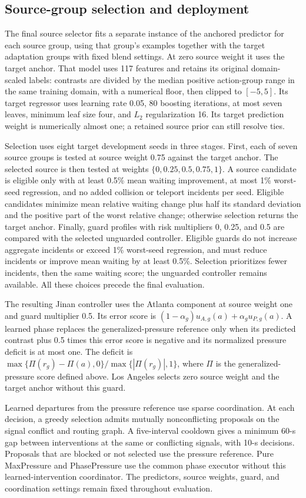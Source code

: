 \subsection{Source-group selection and deployment}
\label{sec:source-selector}
The final source selector fits a separate instance of the anchored predictor for each source group, using that group's examples together with the target adaptation groups with fixed blend settings. At zero source weight it uses the target anchor. That model uses 117 features and retains its original domain-scaled labels: contrasts are divided by the median positive action-group range in the same training domain, with a numerical floor, then clipped to $[-5,5]$. Its target regressor uses learning rate 0.05, 80 boosting iterations, at most seven leaves, minimum leaf size four, and $L_2$ regularization 16. Its target prediction weight is numerically almost one; a retained source prior can still resolve ties.

Selection uses eight target development seeds in three stages. First, each of seven source groups is tested at source weight 0.75 against the target anchor. The selected source is then tested at weights $\{0,0.25,0.5,0.75,1\}$. A source candidate is eligible only with at least 0.5\% mean waiting improvement, at most 1\% worst-seed regression, and no added collision or teleport incidents per seed. Eligible candidates minimize mean relative waiting change plus half its standard deviation and the positive part of the worst relative change; otherwise selection returns the target anchor. Finally, guard profiles with risk multipliers 0, 0.25, and 0.5 are compared with the selected unguarded controller. Eligible guards do not increase aggregate incidents or exceed 1\% worst-seed regression, and must reduce incidents or improve mean waiting by at least 0.5\%. Selection prioritizes fewer incidents, then the same waiting score; the unguarded controller remains available. All these choices precede the final evaluation.

The resulting Jinan controller uses the Atlanta component at source weight one and guard multiplier 0.5. Its error score is $(1-\alpha_g)u_{A,g}(a)+\alpha_g u_{P,g}(a)$. A learned phase replaces the generalized-pressure reference only when its predicted contrast plus 0.5 times this error score is negative and its normalized pressure deficit is at most one. The deficit is $\max\{\Pi(r_g)-\Pi(a),0\}/\max\{|\Pi(r_g)|,1\}$, where $\Pi$ is the generalized-pressure score defined above. Los Angeles selects zero source weight and the target anchor without this guard.

Learned departures from the pressure reference use sparse coordination. At each decision, a greedy selection admits mutually nonconflicting proposals on the signal conflict and routing graph. A five-interval cooldown gives a minimum 60-s gap between interventions at the same or conflicting signals, with 10-s decisions. Proposals that are blocked or not selected use the pressure reference. Pure MaxPressure and PhasePressure use the common phase executor without this learned-intervention coordinator. The predictors, source weights, guard, and coordination settings remain fixed throughout evaluation.
